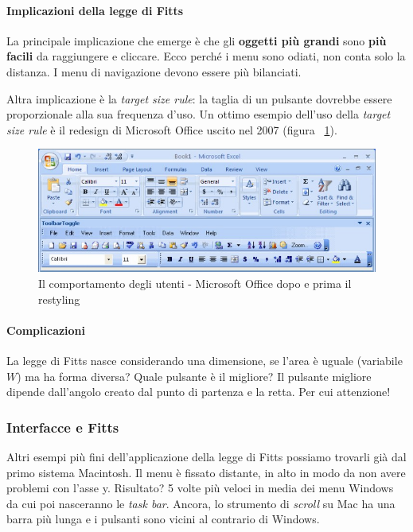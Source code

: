 				\paragraph{Implicazioni della legge di Fitts}
					La principale implicazione che emerge è che gli \textbf{oggetti più grandi} sono \textbf{più facili} da raggiungere e cliccare. Ecco perché i menu sono odiati, non conta solo la distanza. I menu di navigazione devono essere più bilanciati. 
					
					Altra implicazione è la \emph{target size rule}: la taglia di un pulsante dovrebbe essere proporzionale alla sua frequenza d'uso. Un ottimo esempio dell'uso della \emph{target size rule} è il redesign di Microsoft Office uscito nel 2007 (figura ~\ref{fig:ImplicazioniDellaLeggeDiFitts}).
					
					\begin{figure} [h]
						\centering
						\includegraphics[width=\textwidth]{images/IlComportamentoDegliUtenti-ImplicazioniDellaLeggeDiFitts}
						\caption[Il comportamento degli utenti - Microsoft Office dopo e prima il restyling]{Il comportamento degli utenti - Microsoft Office dopo e prima il restyling}
						\label{fig:ImplicazioniDellaLeggeDiFitts}
					\end{figure}
				
				\paragraph{Complicazioni}
					La legge di Fitts nasce considerando una dimensione, se l'area è uguale (variabile $W$) ma ha forma diversa? Quale pulsante è il migliore? Il pulsante migliore dipende dall'angolo creato dal punto di partenza e la retta. Per cui attenzione!
					
			\subsubsection{Interfacce e Fitts}
				Altri esempi più fini dell'applicazione della legge di Fitts possiamo trovarli già dal primo sistema Macintosh. Il menu è fissato distante, in alto in modo da non avere problemi con l'asse y. Risultato? 5 volte più veloci in media dei menu Windows da cui poi nasceranno le \emph{task bar}. Ancora, lo strumento di \emph{scroll} su Mac ha una barra più lunga e i pulsanti sono vicini al contrario di Windows.
				
